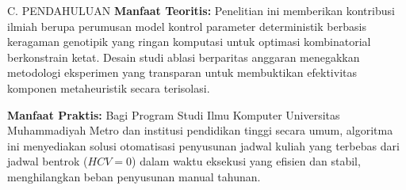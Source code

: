 \documentclass[letterpaper,12pt,oneside]{article}
\begin{document}
\begin{wordsection}{C. PENDAHULUAN}
\noindent\textbf{Manfaat Teoritis:}
Penelitian ini memberikan kontribusi ilmiah berupa perumusan model kontrol parameter deterministik berbasis keragaman genotipik yang ringan komputasi untuk optimasi kombinatorial berkonstrain ketat. Desain studi ablasi berparitas anggaran menegakkan metodologi eksperimen yang transparan untuk membuktikan efektivitas komponen metaheuristik secara terisolasi.

\noindent\textbf{Manfaat Praktis:}
Bagi Program Studi Ilmu Komputer Universitas Muhammadiyah Metro dan institusi pendidikan tinggi secara umum, algoritma ini menyediakan solusi otomatisasi penyusunan jadwal kuliah yang terbebas dari jadwal bentrok ($HCV = 0$) dalam waktu eksekusi yang efisien dan stabil, menghilangkan beban penyusunan manual tahunan.
\end{wordsection}%
\vspace{-1.2pt}%
\end{document}
